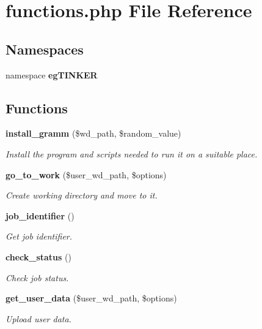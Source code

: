 \section{functions.php File Reference}
\label{functions_8php}
\subsection*{Namespaces}
\begin{CompactItemize}
\item 
namespace {\bf eg\-TINKER}
\end{CompactItemize}
\subsection*{Functions}
\begin{CompactItemize}
\item 
{\bf install\_\-gramm} (\$wd\_\-path, \$random\_\-value)
\begin{CompactList}\small\item\em Install the program and scripts needed to run it on a suitable place. \item\end{CompactList}\item 
{\bf go\_\-to\_\-work} (\$user\_\-wd\_\-path, \$options)
\begin{CompactList}\small\item\em Create working directory and move to it. \item\end{CompactList}\item 
{\bf job\_\-identifier} ()
\begin{CompactList}\small\item\em Get job identifier. \item\end{CompactList}\item 
{\bf check\_\-status} ()
\begin{CompactList}\small\item\em Check job status. \item\end{CompactList}\item 
{\bf get\_\-user\_\-data} (\$user\_\-wd\_\-path, \$options)
\begin{CompactList}\small\item\em Upload user data. \item\end{CompactList}\item 

\end{CompactItemize}

